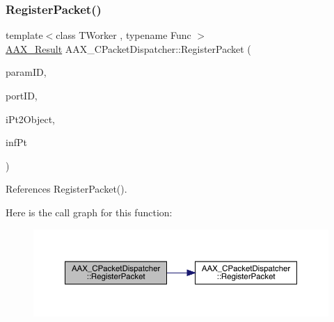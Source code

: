 \subsubsection{\texorpdfstring{RegisterPacket()}{RegisterPacket()}\hspace{0.1cm}{\footnotesize\ttfamily [2/3]}}
{\footnotesize\ttfamily template$<$class T\+Worker , typename Func $>$ \\
\mbox{\hyperlink{a00392_a4d8f69a697df7f70c3a8e9b8ee130d2f}{A\+A\+X\+\_\+\+Result}} A\+A\+X\+\_\+\+C\+Packet\+Dispatcher\+::\+Register\+Packet (\begin{DoxyParamCaption}\item[{\mbox{\hyperlink{a00392_a1440c756fe5cb158b78193b2fc1780d1}{A\+A\+X\+\_\+\+C\+Param\+ID}}}]{param\+ID,  }\item[{\mbox{\hyperlink{a00392_ae807f8986143820cfb5d6da32165c9c7}{A\+A\+X\+\_\+\+C\+Field\+Index}}}]{port\+ID,  }\item[{T\+Worker $\ast$}]{i\+Pt2\+Object,  }\item[{Func}]{inf\+Pt }\end{DoxyParamCaption})\hspace{0.3cm}{\ttfamily [inline]}}



References Register\+Packet().

Here is the call graph for this function\+:
\nopagebreak
\begin{figure}[H]
\begin{center}
\leavevmode
\includegraphics[width=350pt]{a01529_af83ca953818597116ef11a345eef2e36_cgraph}
\end{center}
\end{figure}
\mbox{\label{a01529_a767959a133afaa2e44bfafc79d0b5c69}} 
